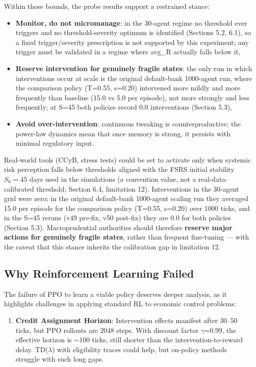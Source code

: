 \documentclass[11pt]{article}
\begin{document}
Within those bounds, the probe results support a restrained stance:

\begin{itemize}
\item \textbf{Monitor, do not micromanage}: in the 30-agent regime no threshold ever triggers and no threshold-severity optimum is identified (Sections 5.2, 6.1), so a fixed trigger/severity prescription is not supported by this experiment; any trigger must be validated in a regime where avg\_R actually falls below it,
\item \textbf{Reserve intervention for genuinely fragile states}: the only run in which interventions occur at scale is the original default-bank 1000-agent run, where the comparison policy (T=0.55, s=0.20) intervened more mildly and more frequently than baseline (15.0 vs 5.0 per episode), not more strongly and less frequently; at S=45 both policies record 0.0 interventions (Section 5.3),
\item \textbf{Avoid over-intervention}: continuous tweaking is counterproductive; the power-law dynamics mean that once memory is strong, it persists with minimal regulatory input.
\end{itemize}

Real-world tools (CCyB, stress tests) could be set to activate only when systemic risk perception falls below thresholds aligned with the FSRS initial stability $S_0 = 45$ days used in the simulations (a convention value, not a real-data-calibrated threshold; Section 6.4, limitation 12). Interventions in the 30-agent grid were zero; in the original default-bank 1000-agent scaling run they averaged 15.0 per episode for the comparison policy (T=0.55, s=0.20) over 1000 ticks, and in the S=45 reruns (v49 pre-fix, v50 post-fix) they are 0.0 for both policies (Section 5.3). Macroprudential authorities should therefore \textbf{reserve major actions for genuinely fragile states}, rather than frequent fine-tuning --- with the caveat that this stance inherits the calibration gap in limitation 12.

\subsection{Why Reinforcement Learning Failed}
The failure of PPO to learn a viable policy deserves deeper analysis, as it highlights challenges in applying standard RL to economic control problems:

\begin{enumerate}
\item \textbf{Credit Assignment Horizon}: Intervention effects manifest after 30--50 ticks, but PPO rollouts are 2048 steps. With discount factor $\gamma$=0.99, the effective horizon is $\sim$100 ticks, still shorter than the intervention-to-reward delay. TD($\lambda$) with eligibility traces could help, but on-policy methods struggle with such long gaps.
\end{enumerate}
\end{document}
